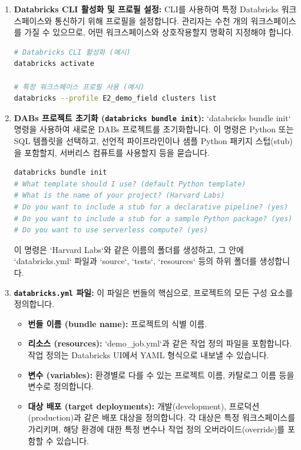 \documentclass[11pt,a4paper]{article}
\begin{document}
\begin{enumerate}
    \item \textbf{Databricks CLI 활성화 및 프로필 설정:}
    CLI를 사용하여 특정 Databricks 워크스페이스와 통신하기 위해 프로필을 설정합니다. 관리자는 수천 개의 워크스페이스를 가질 수 있으므로, 어떤 워크스페이스와 상호작용할지 명확히 지정해야 합니다.
    \begin{lstlisting}[language=bash, caption={Databricks CLI 활성화 및 클러스터 목록 조회}, label={lst:databricks_cli_activate}]
# Databricks CLI 활성화 (예시)
databricks activate

# 특정 워크스페이스 프로필 사용 (예시)
databricks --profile E2_demo_field clusters list
\end{lstlisting}

    \item \textbf{DABs 프로젝트 초기화 (\texttt{databricks bundle init}):}
    `databricks bundle init` 명령을 사용하여 새로운 DABs 프로젝트를 초기화합니다. 이 명령은 Python 또는 SQL 템플릿을 선택하고, 선언적 파이프라인이나 샘플 Python 패키지 스텁(stub)을 포함할지, 서버리스 컴퓨트를 사용할지 등을 묻습니다.
    \begin{lstlisting}[language=bash, caption={DABs 프로젝트 초기화}, label={lst:databricks_bundle_init}]
databricks bundle init
# What template should I use? (default Python template)
# What is the name of your project? (Harvard Labs)
# Do you want to include a stub for a declarative pipeline? (yes)
# Do you want to include a stub for a sample Python package? (yes)
# Do you want to use serverless compute? (yes)
\end{lstlisting}
    이 명령은 `Harvard Labs`와 같은 이름의 폴더를 생성하고, 그 안에 `databricks.yml` 파일과 `source`, `tests`, `resources` 등의 하위 폴더를 생성합니다.

    \item \textbf{\texttt{databricks.yml} 파일:}
    이 파일은 번들의 핵심으로, 프로젝트의 모든 구성 요소를 정의합니다.
    \begin{itemize}
        \item \textbf{번들 이름 (bundle name):} 프로젝트의 식별 이름.
        \item \textbf{리소스 (resources):} `demo_job.yml`과 같은 작업 정의 파일을 포함합니다. 작업 정의는 Databricks UI에서 YAML 형식으로 내보낼 수 있습니다.
        \item \textbf{변수 (variables):} 환경별로 다를 수 있는 프로젝트 이름, 카탈로그 이름 등을 변수로 정의합니다.
        \item \textbf{대상 배포 (target deployments):} 개발(development), 프로덕션(production)과 같은 배포 대상을 정의합니다. 각 대상은 특정 워크스페이스를 가리키며, 해당 환경에 대한 특정 변수나 작업 정의 오버라이드(override)를 포함할 수 있습니다.
    \end{itemize}


\end{enumerate}
\end{document}
